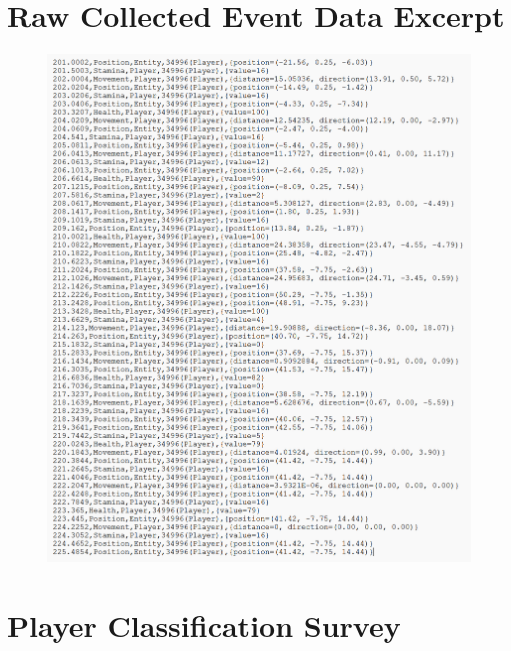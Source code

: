 \chapter{Raw Collected Event Data Excerpt}
\label{anx:raw-collected-event-data}

\begin{figure}[!ht]
    \begin{center}
        \includegraphics[width=34em]{figures/fig-bright-souls-log-excerpt.png}
    \end{center}
\end{figure}

\chapter{Player Classification Survey}
\label{anx:player-classification-survey}

